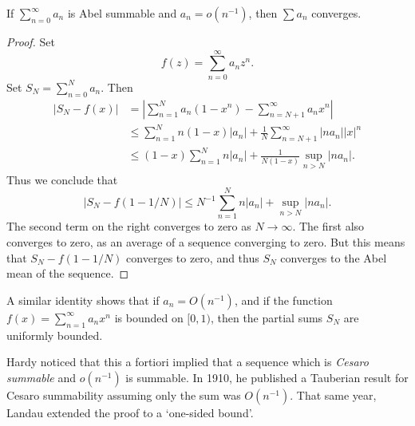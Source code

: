 \begin{theorem}
    If $\sum_{n = 0}^\infty a_n$ is Abel summable and $a_n = o(n^{-1})$, then $\sum a_n$ converges.
\end{theorem}
\begin{proof}
    Set
    \[ f(z) = \sum_{n = 0}^\infty a_n z^n. \]
    Set $S_N = \sum_{n = 0}^N a_n$. Then
    \begin{align*}
        \left| S_N - f(x) \right| &= \left| \sum_{n = 1}^N a_n (1 - x^n) - \sum_{n = N+1}^\infty a_n x^n \right|\\
        &\leq \sum_{n = 1}^N n (1 - x) |a_n| + \frac{1}{N} \sum_{n = N+1}^\infty |na_n| |x|^n\\
        &\leq (1 - x) \sum_{n = 1}^N n |a_n| + \frac{1}{N (1 - x)} \sup_{n > N} |na_n|.
    \end{align*}
    Thus we conclude that
    \[ \left| S_N - f(1 - 1/N) \right| \leq N^{-1} \sum_{n = 1}^N n |a_n| + \sup_{n > N} |na_n|. \]
    The second term on the right converges to zero as $N \to \infty$. The first also converges to zero, as an average of a sequence converging to zero. But this means that $S_N - f(1 - 1/N)$ converges to zero, and thus $S_N$ converges to the Abel mean of the sequence.
\end{proof}

\begin{remark}
    A similar identity shows that if $a_n = O(n^{-1})$, and if the function $f(x) = \sum_{n = 1}^\infty a_n x^n$ is bounded on $[0,1)$, then the partial sums $S_N$ are uniformly bounded.
\end{remark}

Hardy noticed that this a fortiori implied that a sequence which is \emph{Cesaro summable} and $o(n^{-1})$ is summable. In 1910, he published a Tauberian result for Cesaro summability assuming only the sum was $O(n^{-1})$. That same year, Landau extended the proof to a `one-sided bound'.

